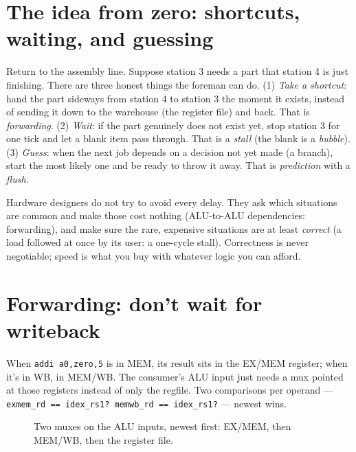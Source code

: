 \section{The idea from zero: shortcuts, waiting, and guessing}
\label{sec:zero07}

Return to the assembly line. Suppose station 3 needs a part that
station 4 is just finishing. There are three honest things the
foreman can do. (1) \emph{Take a shortcut}: hand the part sideways from
station 4 to station 3 the moment it exists, instead of sending it
down to the warehouse (the register file) and back. That is
\emph{forwarding}. (2) \emph{Wait}: if the part genuinely does not exist
yet, stop station 3 for one tick and let a blank item pass through. That
is a \emph{stall} (the blank is a \emph{bubble}). (3) \emph{Guess}: when
the next job depends on a decision not yet made (a branch), start the
most likely one and be ready to throw it away. That is \emph{prediction}
with a \emph{flush}.

\begin{principle}
Hardware designers do not try to avoid every delay. They ask which
situations are common and make those cost nothing (ALU-to-ALU
dependencies: forwarding), and make sure the rare, expensive
situations are at least \emph{correct} (a load followed at once by its
user: a one-cycle stall). Correctness is never negotiable; speed is
what you buy with whatever logic you can afford.
\end{principle}

\section{Forwarding: don't wait for writeback}
\label{sec:fwd07}

\begin{example}\label{ex:fwd07}
When \texttt{addi a0,zero,5} is in MEM, its result sits in the
EX/MEM register; when it's in WB, in MEM/WB. The consumer's ALU
input just needs a mux pointed at those registers instead of only
the regfile. Two comparisons per operand --- \texttt{exmem\_rd ==
idex\_rs1? memwb\_rd == idex\_rs1?} --- newest wins.
\end{example}

\begin{figure}[t]
\centering

\caption[Forwarding paths]{Two muxes on the ALU inputs, newest
first: EX/MEM, then MEM/WB, then the register file.}
\label{fig:fwd07}
\end{figure}

